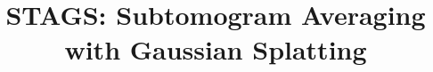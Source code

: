 \documentclass[10pt,twocolumn,letterpaper]{article}
\title{STAGS: Subtomogram Averaging with Gaussian Splatting}
\begin{document}


{
    \small
    
    
}
\end{document}
